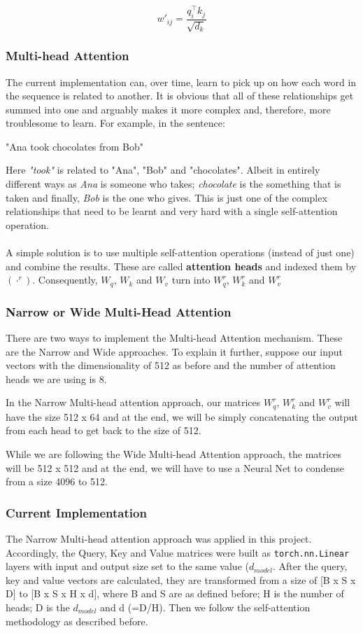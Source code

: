 \documentclass[12pt,a4paper,twoside,openright]{report}
\newcommand{\changedFont}[1]{{\fontfamily{qcr}\selectfont #1}}
\begin{document}
\[ w'_{ij} = \frac{q_i^\top k_j}{\sqrt{d_k}} \]

\subsubsection{Multi-head Attention}

The current implementation can, over time, learn to pick up on how each word in the sequence is related to another. It is obvious that all of these relationships get summed into one and arguably makes it more complex and, therefore, more troublesome to learn. For example, in the sentence: 
\begin{center}
    \changedFont{ "Ana took chocolates from Bob"} 
\end{center}
Here \textit{"took"} is related to "Ana", "Bob" and "chocolates". Albeit in entirely different ways as \textit{Ana} is someone who takes; \textit{chocolate} is the something that is taken and finally, \textit{Bob} is the one who gives. This is just one of the complex relationships that need to be learnt and very hard with a single self-attention operation. 
\\\\
A simple solution is to use multiple self-attention operations (instead of just one) and combine the results. These are called \textbf{attention heads} and indexed them by $(\cdot^r)$. Consequently, $W_q$, $W_k$ and $W_v$ turn into $W^r_q$, $W^r_k$ and $W^r_v$

\subsubsection{Narrow or Wide Multi-Head Attention}

There are two ways to implement the Multi-head Attention mechanism. These are the Narrow and Wide approaches. To explain it further, suppose our input vectors with the dimensionality of 512 as before and the number of attention heads we are using is 8. 

In the Narrow Multi-head attention approach, our matrices $W^r_q$, $W^r_k$ and $W^r_v$ will have the size 512 x 64 and at the end, we will be simply concatenating the output from each head to get back to the size of 512. 

While we are following the Wide Multi-head Attention approach, the matrices will be 512 x 512 and at the end, we will have to use a Neural Net to condense from a size 4096 to 512.

\subsubsection{Current Implementation}
The Narrow Multi-head attention approach was applied in this project. Accordingly, the Query, Key and Value matrices were built as \lstinline{torch.nn.Linear} layers with input and output size set to the same value ($d_{model}$. After the query, key and value vectors are calculated, they are transformed from a size of [B x S x D] to [B x S x H x d], where B and S are as defined before; H is the number of heads; D is the $d_{model}$ and d (=D/H). Then we follow the self-attention methodology as described before. 
\end{document}
